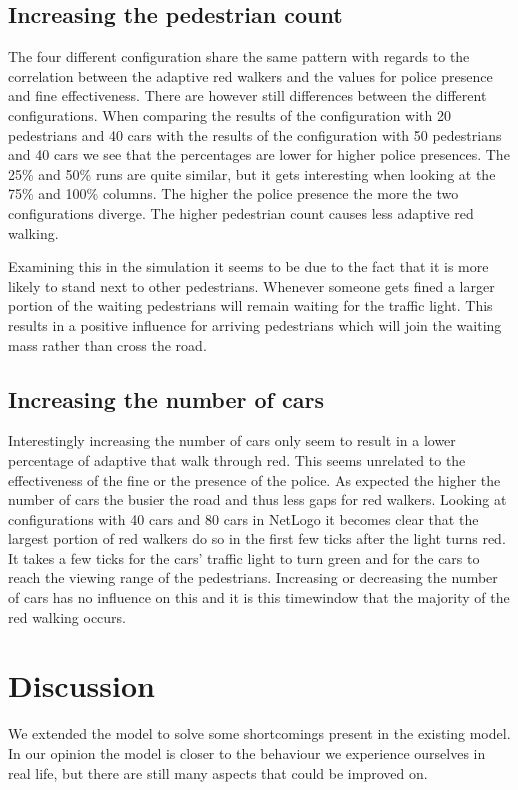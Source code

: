 \documentclass[a4paper]{article}
\begin{document}
\subsection{Increasing the pedestrian count}
The four different configuration share the same pattern with regards to the correlation between the adaptive red walkers and the values for police presence and fine effectiveness. There are however still differences between the different configurations. When comparing the results of the configuration with 20 pedestrians and 40 cars with the results of the configuration with 50 pedestrians and 40 cars we see that the percentages are lower for higher police presences. The 25\% and 50\% runs are quite similar, but it gets interesting when looking at the 75\% and 100\% columns. The higher the police presence the more the two configurations diverge. The higher pedestrian count causes less adaptive red walking.

Examining this in the simulation it seems to be due to the fact that it is more likely to stand next to other pedestrians. Whenever someone gets fined a larger portion of the waiting pedestrians will remain waiting for the traffic light. This results in a positive influence for arriving pedestrians which will join the waiting mass rather than cross the road.

\subsection{Increasing the number of cars}
Interestingly increasing the number of cars only seem to result in a lower percentage of adaptive that walk through red. This seems unrelated to the effectiveness of the fine or the presence of the police. As expected the higher the number of cars the busier the road and thus less gaps for red walkers. Looking at configurations with 40 cars and 80 cars in NetLogo it becomes clear that the largest portion of red walkers do so in the first few ticks after the light turns red. It takes a few ticks for the cars' traffic light to turn green and for the cars to reach the viewing range of the pedestrians. Increasing or decreasing the number of cars has no influence on this and it is this timewindow that the majority of the red walking occurs.

\clearpage

\section{Discussion}
We extended the model to solve some shortcomings present in the existing model. In our opinion the model is closer to the behaviour we experience ourselves in real life, but there are still many aspects that could be improved on.
\end{document}
